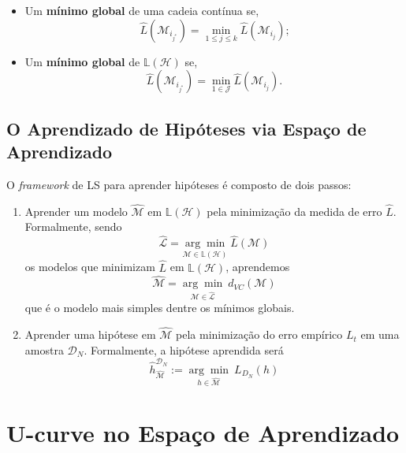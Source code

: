 \begin{definition}
\begin{itemize}
        \item Um \textbf{mínimo global} de uma cadeia contínua se,
        $$ \hat{L}  \left( \mathcal{M}_{i_{j^{*}}} \right) = \min_{1 \leq j \leq k} \hat{L}  \left( \mathcal{M}_{i_{j}} \right) \text{;}$$

        \item Um \textbf{mínimo global} de $\mathbb{L} \left( \mathcal{H} \right)$ se,
        $$ \hat{L}  \left( \mathcal{M}_{i_{j^{*}}} \right) = \min_{1 \in \mathcal{J}} \hat{L}  \left( \mathcal{M}_{i_{j}} \right) \text{.}$$
        
    \end{itemize}
    \label{def:minimos}
\end{definition}

\subsection{O Aprendizado de Hipóteses via Espaço de Aprendizado}

O \textit{framework} de LS para aprender hipóteses é composto de dois passos:

\begin{enumerate}
    \item Aprender um modelo $\hat{\mathcal{M}}$ em $\mathbb{L} \left( \mathcal{H} \right)$ pela minimização da medida de erro $\hat{L}$. Formalmente, sendo    
    $$\hat{\mathcal{L}} =  \underset{\mathcal{M}\in \mathbb{L}\left( \mathcal{H}\right)}{\arg \min} \  \hat{L} \left( \mathcal{M} \right)$$
    os modelos que minimizam $\hat{L}$ em $\mathbb{L}(\mathcal{H})$, aprendemos   
   $$\hat{\mathcal{M}} =  \underset{\mathcal{M}\in \hat{\mathcal{L}}}{\arg \min} \  d_{VC} \left( \mathcal{M} \right)$$
   que é o modelo mais simples dentre os mínimos globais.

   \item Aprender uma hipótese em $\hat{\mathcal{M}}$ pela minimização do erro empírico $L_{t}$ em uma amostra $\mathcal{D}_{N}$. Formalmente, a hipótese aprendida será
   $$ \hat{h}_{\hat{\mathcal{M}}}^{\mathcal{D}_{N}} := \underset{h \in \hat{\mathcal{M}}}{\arg \min} \ L_{D_{N}} \left( h \right)$$
\end{enumerate}


\section{U-curve no Espaço de Aprendizado}
\label{sec:ucurve}

